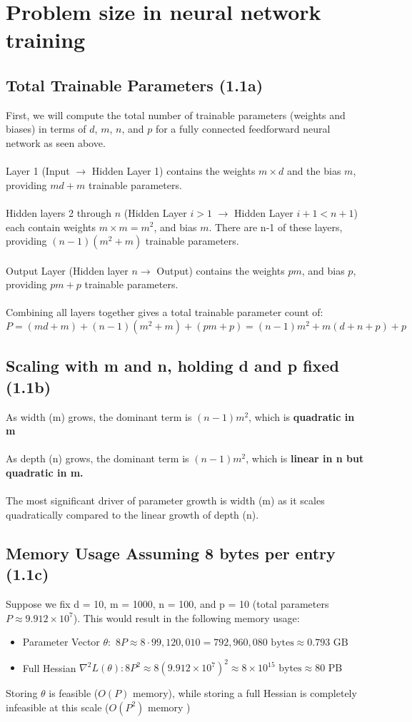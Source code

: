 \documentclass[11pt]{article}
\begin{document}
\newpage

\section*{Problem size in neural network training}
\subsection*{Total Trainable Parameters (1.1a)}
First, we will compute the total number of trainable parameters (weights and biases) in terms of $d$, $m$, $n$, and $p$ for a fully connected feedforward neural network as seen above. 
\\
\\
Layer 1 (Input $\rightarrow$ Hidden Layer 1) contains the weights $m\times d$ and the bias $m$, providing $md+m$ trainable parameters. 
\\
\\
Hidden layers 2 through $n$ (Hidden Layer $i > 1$ $\rightarrow$ Hidden Layer $i+1 < n+1$) each contain weights $m\times m = m^2$, and bias $m$. There are n-1 of these layers, providing $(n-1)(m^2+m)$ trainable parameters. 
\\
\\
Output Layer (Hidden layer $n \rightarrow$ Output) contains the weights $pm$, and bias $p$, providing $pm+p$ trainable parameters. 
\\
\\
Combining all layers together gives a total trainable parameter count of: 
\[
P = (md+m) + (n-1)(m^2+m) + (pm+p) = (n-1)m^2 + m(d + n + p) +p
\]
\subsection*{Scaling with m and n, holding d and p fixed (1.1b)}
As width (m) grows, the dominant term is $(n-1)m^2$, which is \textbf{quadratic in m}
\\
\\
As depth (n) grows, the dominant term is $(n-1)m^2$, which is \textbf{linear in n but quadratic in m. }
\\
\\
The most significant driver of parameter growth is width (m) as it scales quadratically compared to the linear growth of depth (n). 
\subsection*{Memory Usage Assuming 8 bytes per entry (1.1c)}
Suppose we fix d = 10, m = 1000, n = 100, and p = 10 (total parameters $P\approx 9.912 \times 10^7$). This would result in the following memory usage: 
\begin{itemize}
    \item Parameter Vector $\theta:$ $8P \approx 8\cdot 99,120,010 = 792,960,080 \text{ bytes} \approx 0.793 \text { GB}$
    \item Full Hessian $\nabla^2L(\theta): 8P^2 \approx 8(9.912 \times 10^7)^2 \approx 8\times 10^{15} \text{ bytes} \approx 80 \text{ PB}$
\end{itemize}
Storing $\theta$ is feasible ($O(P)$ memory), while storing a full Hessian is completely infeasible at this scale ($O(P^2)$ memory ) 
\end{document}
